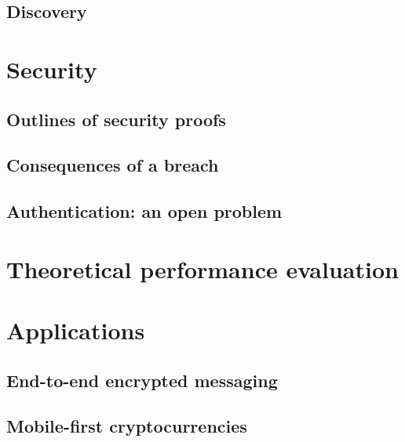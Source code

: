 	
	\subsection{Discovery}


\section{Security}
\label{sec:security}

	\subsection{Outlines of security proofs}

	\subsection{Consequences of a breach}
	
	\subsection{Authentication: an open problem}


\section{Theoretical performance evaluation}
\label{sec:performance}


\section{Applications}
\label{sec:applications}

	\subsection{End-to-end encrypted messaging}
	
	\subsection{Mobile-first cryptocurrencies}
